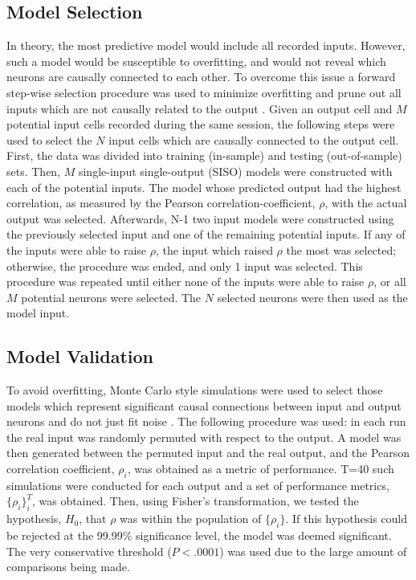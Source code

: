 \documentclass[11pt,a4paper,final]{article}
\begin{document}
    \subsection{Model Selection}
In theory, the most predictive model would include all recorded inputs.
However, such a model would be susceptible to overfitting, and would not reveal which neurons are causally connected to each other.
To overcome this issue a forward step-wise selection procedure was used to minimize overfitting and prune out all inputs which are not causally related to the output \citep{song09}.
Given an output cell and $M$ potential input cells recorded during the same session, the following steps were used to select the $N$ input cells which are causally connected to the output cell.
First, the data was divided into training (in-sample) and testing (out-of-sample) sets.
Then, $M$ single-input single-output (SISO) models were constructed with each of the potential inputs.
The model whose predicted output had the highest correlation, as measured by the Pearson correlation-coefficient, $\rho$, with the actual output was selected. Afterwards, N-1 two input models were constructed using the previously selected input and one of the remaining potential inputs.
If any of the inputs were able to raise $\rho$, the input which raised $\rho$ the most was selected; otherwise, the procedure was ended, and only 1 input was selected.
This procedure was repeated until either none of the inputs were able to raise $\rho$, or all $M$ potential neurons were selected. The $N$ selected neurons were then used as the model input.

    \subsection{Model Validation}
To avoid overfitting, Monte Carlo style simulations were used to select those models which represent significant causal connections between input and output neurons and do not just fit noise \citep{zanos08}.
The following procedure was used: in each run the real input was randomly permuted with respect to the output.
A model was then generated between the permuted input and the real output, and the Pearson correlation coefficient, $\rho_{i}$, was obtained as a metric of performance.
T=40 such simulations were conducted for each output and a set of performance metrics, $\{\rho_{i}\}_{i}^{T}$, was obtained.
Then, using Fisher's transformation, we tested the hypothesis, $H_{0}$, that $\rho$ was within the population of $\{\rho_{i}\}$.
If this hypothesis could be rejected at the 99.99\% significance level, the model was deemed significant.
The very conservative threshold ($P<.0001$) was used due to the large amount of comparisons being made.
\end{document}
